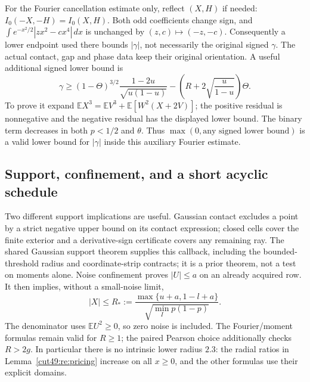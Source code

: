 \documentclass[11pt,a4paper]{article}
\numberwithin{equation}{section}
\theoremstyle{definition}
\theoremstyle{remark}
\newcommand{\E}{\mathbb E}
\begin{document}
For the Fourier cancellation estimate only, reflect $(X,H)$ if needed:
$I_0(-X,-H)=I_0(X,H)$. Both odd coefficients change sign, and
$\int e^{-x^2/2}|zx^2-cx^4|\,dx$ is unchanged by $(z,c)\mapsto(-z,-c)$.
Consequently a lower endpoint used there bounds $|\gamma|$, not necessarily
the original signed $\gamma$. The actual contact, gap and phase data keep
their original orientation. A useful additional signed lower bound is
\begin{equation}\label{cut49:re:gamma}
 \gamma\ge(1-\Theta)^{3/2}\frac{1-2u}{\sqrt{u(1-u)}}
       -\left(R+2\sqrt{\frac{u}{1-u}}\right)\Theta.
\end{equation}
To prove it expand $\E X^3=\E V^3+\E[W^2(X+2V)]$; the positive
residual is nonnegative and the negative residual has the displayed
lower bound. The binary term decreases in both $p<1/2$ and $\theta$.
Thus $\max(0,\text{any signed lower bound})$ is a valid lower bound for
$|\gamma|$ inside this auxiliary Fourier estimate.

\subsection{Support, confinement, and a short acyclic schedule}
Two different support implications are useful. Gaussian contact excludes
a point by a strict negative upper bound on its contact expression;
closed cells cover the finite exterior and a derivative-sign certificate
covers any remaining ray. The shared Gaussian support theorem supplies
this callback, including the bounded-threshold radius and coordinate-strip
contracts; it is a prior theorem, not a test on moments alone. Noise confinement proves $|U|\le a$ on an
already acquired row. It then implies, without a small-noise limit,
\begin{equation}\label{cut49:re:radiusfeedback}
 |X|\le R_*:=
 \frac{\max\{u+a,1-l+a\}}{\sqrt{\min_Ip(1-p)}}.
\end{equation}
The denominator uses $\E U^2\ge0$, so zero noise is included.
The Fourier/moment formulas remain valid for $R\ge1$; the paired Pearson
choice additionally checks $R>2g$. In particular there is no intrinsic
lower radius $2.3$: the radial ratios in Lemma~\ref{cut49:re:pricing} increase
on all $x\ge0$, and the other formulas use their explicit domains.
\end{document}
